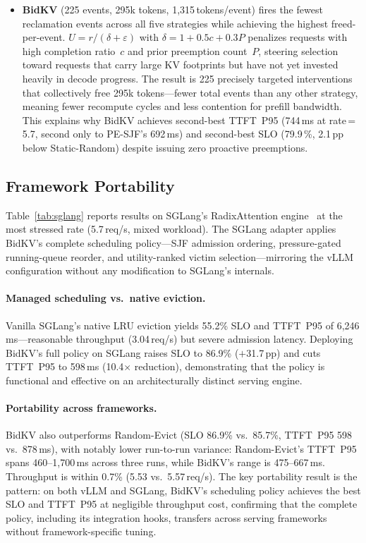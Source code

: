 \documentclass[sigconf,nonacm]{acmart}
\newcommand{\bidkv}{BidKV\xspace}
\begin{document}
\begin{itemize}[leftmargin=*,nosep]
\item \textbf{\bidkv} (225 events, 295k tokens, 1{,}315\,tokens/event) fires
  the fewest reclamation events across all five strategies while achieving the
  highest freed-per-event.  $U = r / (\delta + \varepsilon)$ with
  $\delta = 1 + 0.5c + 0.3P$ penalizes requests with high completion
  ratio~$c$ and prior preemption count~$P$, steering selection toward requests
  that carry large KV footprints but have not yet invested heavily in decode
  progress.  The result is 225 precisely targeted interventions that
  collectively free 295k tokens---fewer total events than any other strategy,
  meaning fewer recompute cycles and less contention for prefill bandwidth.
  This explains why \bidkv achieves second-best TTFT~P95 (744\,ms at
  rate\,=\,5.7, second only to PE-SJF's 692\,ms) and second-best SLO
  (79.9\,\%, 2.1\,pp below Static-Random) despite issuing zero proactive
  preemptions.
\end{itemize}

\subsection{Framework Portability}\label{sec:eval:sglang}



Table~\ref{tab:sglang} reports results on SGLang's RadixAttention
engine~\cite{Zheng2024sglang} at the most stressed rate (5.7\,req/s, mixed
workload).  The SGLang adapter applies \bidkv's complete scheduling
policy---SJF admission ordering, pressure-gated running-queue reorder, and
utility-ranked victim selection---mirroring the vLLM configuration without
any modification to SGLang's internals.

\paragraph{Managed scheduling vs.~native eviction.}
Vanilla SGLang's native LRU eviction yields 55.2\% SLO and
TTFT~P95 of 6{,}246\,ms---reasonable throughput (3.04\,req/s) but severe
admission latency.  Deploying \bidkv's full policy on SGLang raises SLO to
86.9\% ($+$31.7\,pp) and cuts TTFT~P95 to 598\,ms (10.4$\times$ reduction),
demonstrating that the policy is functional and effective on an
architecturally distinct serving engine.

\paragraph{Portability across frameworks.}
\bidkv also outperforms Random-Evict (SLO 86.9\% vs.~85.7\%, TTFT~P95
598 vs.~878\,ms), with notably lower run-to-run variance: Random-Evict's
TTFT~P95 spans 460--1{,}700\,ms across three runs, while \bidkv's
range is 475--667\,ms.  Throughput is within 0.7\% (5.53 vs.~5.57\,req/s).
The key portability result is the pattern: on both vLLM and SGLang,
\bidkv's scheduling policy achieves the best SLO and TTFT~P95 at
negligible throughput cost, confirming that the complete policy, including
its integration hooks, transfers across serving frameworks without
framework-specific tuning.
\end{document}
